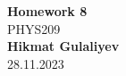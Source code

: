 \begin{titlepage}
    \begin{center}
    {\fontsize{40}{48}\selectfont \bfseries Homework 8} 
    \\\vspace{20pt}
    {\LARGE PHYS209} \\
    \vspace{20pt}
    \textbf{Hikmat Gulaliyev}
    \vspace{8pt}
    \\ 28.11.2023
    \end{center}
\end{titlepage}